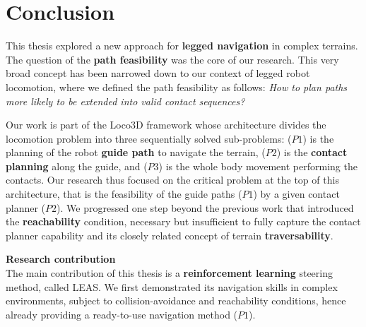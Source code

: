\chapter{Conclusion}
\label{sec:conclusion}





This thesis explored a new approach for \textbf{legged navigation} in complex terrains. 
The question of the \textbf{path feasibility} was the core of our research.
This very broad concept has been narrowed down to our context of legged robot locomotion, where we defined the path feasibility as follows:
\textit{How to plan paths more likely to be extended into valid contact sequences?}

\hfill \break

Our work is part of the Loco3D framework whose architecture divides the locomotion problem into three sequentially solved sub-problems: ($P1$) is the planning of the robot \textbf{guide path} to navigate the terrain, ($P2$) is the \textbf{contact planning} along the guide, and ($P3$) is the whole body movement performing the contacts.
Our research thus focused on the critical problem at the top of this architecture, that is the feasibility of the guide paths ($P1$) by a given contact planner ($P2$). We progressed one step beyond the previous work \cite{RB-PRM} that introduced the \textbf{reachability} condition, necessary but insufficient to fully capture the contact planner capability and its closely related concept of terrain \textbf{traversability}.

\hfill \break
\hfill \break

\noindent\textbf{Research contribution}\\

The main contribution of this thesis is a \textbf{reinforcement learning} steering method, called LEAS. We first demonstrated its navigation skills in complex environments, subject to collision-avoidance and reachability conditions, hence already providing a ready-to-use navigation method ($P1$).

